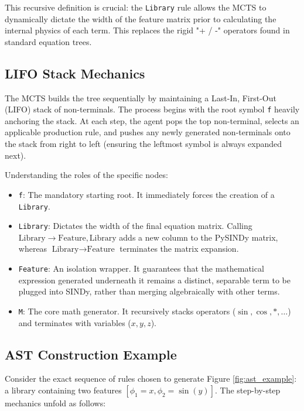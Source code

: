\documentclass[11pt,a4paper]{article}
\begin{document}
This recursive definition is crucial: the \texttt{Library} rule allows the MCTS to dynamically dictate the width of the feature matrix prior to calculating the internal physics of each term. This replaces the rigid "+ / -" operators found in standard equation trees.

\subsection{LIFO Stack Mechanics}
The MCTS builds the tree sequentially by maintaining a Last-In, First-Out (LIFO) stack of non-terminals. The process begins with the root symbol \texttt{f} heavily anchoring the stack. At each step, the agent pops the top non-terminal, selects an applicable production rule, and pushes any newly generated non-terminals onto the stack from right to left (ensuring the leftmost symbol is always expanded next).

Understanding the roles of the specific nodes:
\begin{itemize}
    \item \texttt{f}: The mandatory starting root. It immediately forces the creation of a \texttt{Library}.
    \item \texttt{Library}: Dictates the width of the final equation matrix. Calling $\text{Library} \rightarrow \text{Feature}, \text{Library}$ adds a new column to the PySINDy matrix, whereas $\text{Library} \rightarrow \text{Feature}$ terminates the matrix expansion.
    \item \texttt{Feature}: An isolation wrapper. It guarantees that the mathematical expression generated underneath it remains a distinct, separable term to be plugged into SINDy, rather than merging algebraically with other terms.
    \item \texttt{M}: The core math generator. It recursively stacks operators ($\sin, \cos, *, \dots$) and terminates with variables ($x, y, z$).
\end{itemize}

\subsection{AST Construction Example}
Consider the exact sequence of rules chosen to generate Figure \ref{fig:ast_example}: a library containing two features $[\phi_1 = x, \phi_2 = \sin(y)]$. The step-by-step mechanics unfold as follows:
\end{document}
